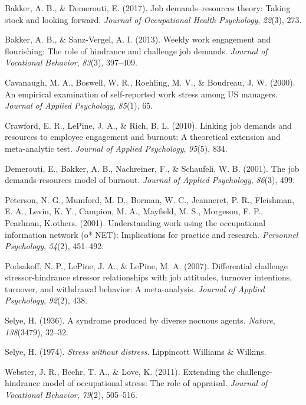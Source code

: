 \documentclass[
  man]{apa6}
\newlength{\cslhangindent}
\newlength{\cslentryspacingunit} %
\newenvironment{CSLReferences}[2] %
 {%
  \setlength{\parindent}{0pt}
  \ifodd #1
  \let\oldpar\par
  \def\par{\hangindent=\cslhangindent\oldpar}
  \fi
  \setlength{\parskip}{#2\cslentryspacingunit}
 }%
 {}
\begin{document}
\hypertarget{refs}{}
\begin{CSLReferences}{1}{0}
\leavevmode{}%
Bakker, A. B., \& Demerouti, E. (2017). Job demands--resources theory: Taking stock and looking forward. \emph{Journal of Occupational Health Psychology}, \emph{22}(3), 273.

\leavevmode{}%
Bakker, A. B., \& Sanz-Vergel, A. I. (2013). Weekly work engagement and flourishing: The role of hindrance and challenge job demands. \emph{Journal of Vocational Behavior}, \emph{83}(3), 397--409.

\leavevmode{}%
Cavanaugh, M. A., Boswell, W. R., Roehling, M. V., \& Boudreau, J. W. (2000). An empirical examination of self-reported work stress among US managers. \emph{Journal of Applied Psychology}, \emph{85}(1), 65.

\leavevmode{}%
Crawford, E. R., LePine, J. A., \& Rich, B. L. (2010). Linking job demands and resources to employee engagement and burnout: A theoretical extension and meta-analytic test. \emph{Journal of Applied Psychology}, \emph{95}(5), 834.

\leavevmode{}%
Demerouti, E., Bakker, A. B., Nachreiner, F., \& Schaufeli, W. B. (2001). The job demands-resources model of burnout. \emph{Journal of Applied Psychology}, \emph{86}(3), 499.

\leavevmode{}%
Peterson, N. G., Mumford, M. D., Borman, W. C., Jeanneret, P. R., Fleishman, E. A., Levin, K. Y., Campion, M. A., Mayfield, M. S., Morgeson, F. P., Pearlman, K.others. (2001). Understanding work using the occupational information network (o* NET): Implications for practice and research. \emph{Personnel Psychology}, \emph{54}(2), 451--492.

\leavevmode{}%
Podsakoff, N. P., LePine, J. A., \& LePine, M. A. (2007). Differential challenge stressor-hindrance stressor relationships with job attitudes, turnover intentions, turnover, and withdrawal behavior: A meta-analysis. \emph{Journal of Applied Psychology}, \emph{92}(2), 438.

\leavevmode{}%
Selye, H. (1936). A syndrome produced by diverse nocuous agents. \emph{Nature}, \emph{138}(3479), 32--32.

\leavevmode{}%
Selye, H. (1974). \emph{Stress without distress}. Lippincott Williams \& Wilkins.

\leavevmode{}%
Webster, J. R., Beehr, T. A., \& Love, K. (2011). Extending the challenge-hindrance model of occupational stress: The role of appraisal. \emph{Journal of Vocational Behavior}, \emph{79}(2), 505--516.

\end{CSLReferences}
\end{document}
